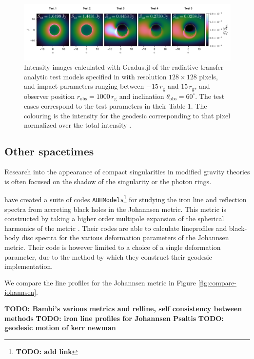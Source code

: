 \documentclass[fleqn,usenatbib]{mnras}
\newcommand{\todo}[1]{{\noindent \bf \color{red} TODO: #1}}
\newcommand{\Gradus}{Gradus.jl }
\newcommand{\rg}{r_\text{g}}
\begin{document}
\begin{figure}
	\centering
	\includegraphics[width=0.99\linewidth]{figures/radiative-transfer.gold.pdf}
	\caption{Intensity images calculated with \Gradus of the radiative transfer analytic test models specified in \citet{gold_verification_2020} with resolution $128 \times 128$ pixels, and impact parameters ranging between $-15\, \rg$ and $15\, \rg$, and observer position $r_\text{obs} = 1000\, \rg$ and inclination $\theta_\text{obs} = 60^\circ$. The test cases correspond to the test parameters in their Table 1. The colouring is the intensity for the geodesic corresponding to that pixel normalized over the total intensity .}
	\label{fig:gold-test-problems}
\end{figure}

\subsection{Other spacetimes}

Research into the appearance of compact singularities in modified gravity theories is often focused on the shadow of the singularity or the photon rings.

\cite{bambi_testing_2017,abdikamalov_testing_2020} have created a suite of codes \texttt{ABHModels}\footnote{\todo{add link}} for studying the iron line and reflection spectra from accreting black holes in the Johannsen metric. This metric is constructed by taking a higher order multipole expansion of the spherical harmonics of the metric \citep{johannsen_regular_2013}. Their codes are able to calculate lineprofiles and black-body disc spectra for the various deformation parameters of the Johannsen metric. Their code is however limited to a choice of a single deformation parameter, due to the method by which they construct their geodesic implementation.

We compare the line profiles for the Johannsen metric in Figure \ref{fig:compare-johannsen}.

\todo{Bambi's various metrics and relline, self consistency between methods}
\todo{iron line profiles for Johannsen Psaltis}
\todo{geodesic motion of kerr newman}
\end{document}
